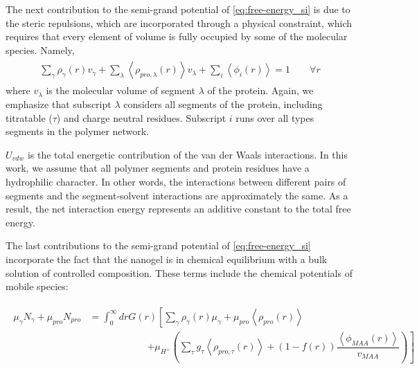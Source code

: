 \documentclass[journal=jacsat,manuscript=suppinfo]{achemso}
\begin{document}
The next contribution to the semi-grand potential of \cref{eq:free-energy_si} is due to the steric repulsions, which are incorporated through a physical constraint, which requires that every element of volume is fully occupied by some of the molecular species.
Namely, 
\begin{align}
	\begin{aligned}
		\sum_{\gamma}\rho_\gamma(r) v_\gamma + \sum_\lambda{\left<\rho_{pro,\lambda}(r)\right>v_\lambda} + \sum_i{\left<\phi_i(r)\right>} = 1\hspace{2em} \forall r
	\end{aligned}
	\label{si:eq:constraint}
\end{align}
\noindent where $v_\lambda$ is the molecular volume of segment $\lambda$ of the protein.
Again, we emphasize that subscript $\lambda$ considers all segments of the protein, including titratable  ($\tau$) and charge neutral residues.
Subscript $i$ runs over  all types segments in the  polymer network.




$U_{vdw}$ is the total energetic contribution of the van der Waals interactions.
In this work, we assume that all polymer segments and protein residues have a hydrophilic character.
In other words, the interactions between different pairs of segments and the segment-solvent interactions are approximately the same.
As a result, the net interaction energy represents an additive constant to the total free energy.



The last contributions to the semi-grand potential of \cref{eq:free-energy_si} incorporate the fact that the nanogel is in chemical equilibrium with a bulk solution of controlled composition.
These terms include the chemical potentials of mobile species:



\begin{align}
	\begin{aligned}
		\mu_\gamma N_\gamma + \mu_{pro} N_{pro} &=\int_0^\infty drG(r)\left[\sum_{\gamma }{\rho_\gamma(r)\mu_\gamma}
		+ \mu_{pro} \left<\rho_{pro}(r)\right> \right. \\
		& \hspace{6em}\left. +\mu_{H^+}\left(\sum_{\tau}{g_\tau\left<\rho_{pro,\tau}(r)\right> } +(1-f(r))\dfrac{\left<\phi_{MAA}(r)\right>}{v_{MAA}}\right)\right]
	\end{aligned}
\end{align}
\end{document}
